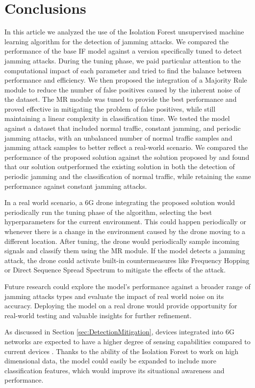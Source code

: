 \documentclass[futureinternet,article,submit,pdftex,moreauthors]{Definitions/mdpi}
\begin{document}
\section{Conclusions}

In this article we analyzed the use of the Isolation Forest unsupervised machine learning algorithm for the detection of jamming attacks. We compared the performance of the base IF model against a version specifically tuned to detect jamming attacks. During the tuning phase, we paid particular attention to the computational impact of each parameter and tried to find the balance between performance and efficiency. 
We then proposed the integration of a Majority Rule module to reduce the number of false positives caused by the inherent noise of the dataset. The MR module was tuned to provide the best performance and proved effective in mitigating the problem of false positives, while still maintaining a linear complexity in classification time.
We tested the model against a dataset that included normal traffic, constant jamming, and periodic jamming attacks, with an unbalanced number of normal traffic samples and jamming attack samples to better reflect a real-world scenario.
We compared the performance of the proposed solution against the solution proposed by \cite{JammingDetectionIoT-Hussain} and found that our solution outperformed the existing solution in both the detection of periodic jamming and the classification of normal traffic, while retaining the same performance against constant jamming attacks.


In a real world scenario, a 6G drone integrating the proposed solution would periodically run the tuning phase of the algorithm, selecting the best hyperparameters for the current environment. This could happen periodically or whenever there is a change in the environment caused by the drone moving to a different location. 
After tuning, the drone would periodically sample incoming signals and classify them using the MR module. If the model detects a jamming attack, the drone could activate built-in countermeasures like Frequency Hopping or Direct Sequence Spread Spectrum  to mitigate the effects of the attack. 

Future research could explore the model's performance against a broader range of jamming attacks types and evaluate the impact of real world noise on its accuracy.
Deploying the model on a real drone would provide opportunity for real-world testing and valuable insights for further refinement.

As discussed in Section \ref{sec:DetectionMitigation}, devices integrated into 6G networks are expected to have a higher degree of sensing capabilities compared to current devices \cite{6GRoadmapLetaief}. Thanks to the ability of the Isolation Forest to work on high dimensional data, the model could easily be expanded to include more classification features, which would improve its situational awareness and performance.
\end{document}
